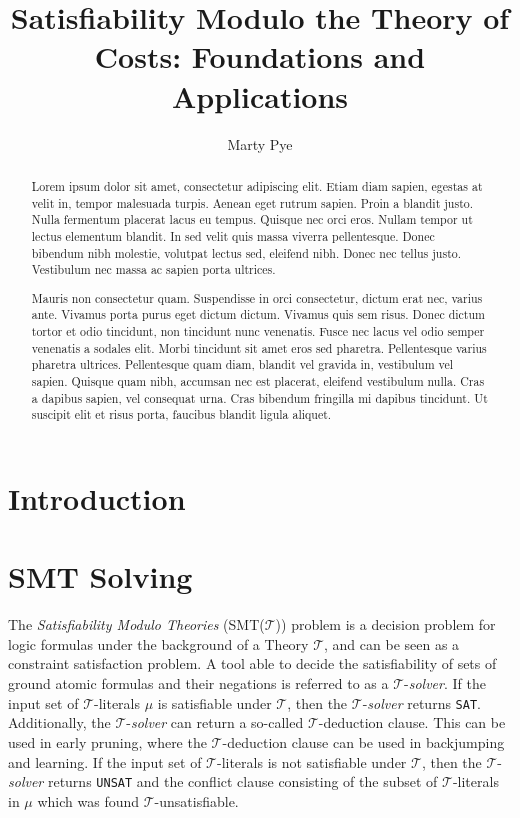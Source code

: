 \documentclass{amsart}
\theoremstyle{definition}
\theoremstyle{remark}
\numberwithin{equation}{section}
\def\T{$\mathcal{T}$}
\def\TSolver{$\mathcal{T}$-\emph{solver}}
\def\sat{\texttt{SAT}}
\def\unsat{\texttt{UNSAT}}
\begin{document}
  \title[Satisfiability Modulo the Theory of Costs]{Satisfiability Modulo the Theory of Costs: Foundations and Applications}

  \author{Marty Pye}
  \address{RWTH Aachen University}

  \begin{abstract}
    Lorem ipsum dolor sit amet, consectetur adipiscing elit. Etiam diam sapien, egestas at velit in, tempor malesuada turpis. Aenean eget rutrum sapien. Proin a blandit justo. Nulla fermentum placerat lacus eu tempus. Quisque nec orci eros. Nullam tempor ut lectus elementum blandit. In sed velit quis massa viverra pellentesque. Donec bibendum nibh molestie, volutpat lectus sed, eleifend nibh. Donec nec tellus justo. Vestibulum nec massa ac sapien porta ultrices.

    Mauris non consectetur quam. Suspendisse in orci consectetur, dictum erat nec, varius ante. Vivamus porta purus eget dictum dictum. Vivamus quis sem risus. Donec dictum tortor et odio tincidunt, non tincidunt nunc venenatis. Fusce nec lacus vel odio semper venenatis a sodales elit. Morbi tincidunt sit amet eros sed pharetra. Pellentesque varius pharetra ultrices. Pellentesque quam diam, blandit vel gravida in, vestibulum vel sapien. Quisque quam nibh, accumsan nec est placerat, eleifend vestibulum nulla. Cras a dapibus sapien, vel consequat urna. Cras bibendum fringilla mi dapibus tincidunt. Ut suscipit elit et risus porta, faucibus blandit ligula aliquet.
  \end{abstract}

  \maketitle

  \section{Introduction}
  \section{SMT Solving}
    The \emph{Satisfiability Modulo Theories} (SMT($\mathcal{T}$)) problem is a decision problem for logic formulas under the background of a Theory $\mathcal{T}$, and can be seen as a constraint satisfaction problem.
    A tool able to decide the satisfiability of sets of ground atomic formulas and their negations is referred to as a $\mathcal{T}$-\emph{solver}.
    If the input set of \T{}-literals $\mu$ is satisfiable under \T{}, then the \TSolver{} returns \sat{}.
    Additionally, the \TSolver{} can return a so-called \T{}-deduction clause. This can be used in early pruning, where the \T{}-deduction clause can be used in backjumping and learning.
    If the input set of \T{}-literals is not satisfiable under \T{}, then the \TSolver{} returns \unsat{} and the conflict clause consisting of the subset of \T{}-literals in $\mu$ which was found \T{}-unsatisfiable.
\end{document}
